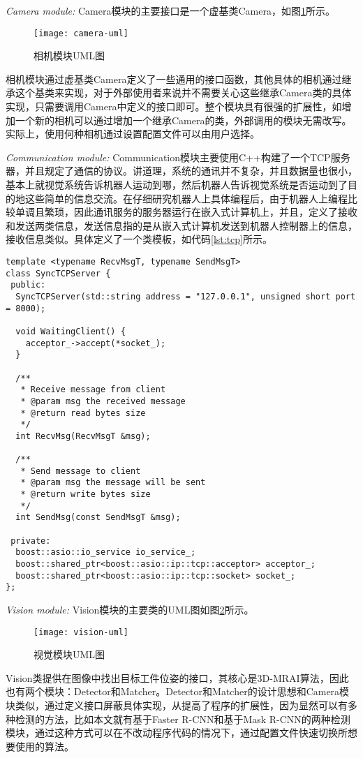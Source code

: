 \emph{Camera module:}
Camera模块的主要接口是一个虚基类Camera，如图\ref{fig:camera-uml}所示。
\begin{figure}[ht]
  \centering
  \texttt{[image: camera-uml]}
  \caption{相机模块UML图}
  \label{fig:camera-uml}
\end{figure}
相机模块通过虚基类Camera定义了一些通用的接口函数，其他具体的相机通过继承这个基类来实现，对于外部使用者来说并不需要关心这些继承Camera类的具体实现，只需要调用Camera中定义的接口即可。整个模块具有很强的扩展性，如增加一个新的相机可以通过增加一个继承Camera的类，外部调用的模块无需改写。实际上，使用何种相机通过设置配置文件可以由用户选择。

\emph{Communication module:}
Communication模块主要使用C++构建了一个TCP服务器，并且规定了通信的协议。讲道理，系统的通讯并不复杂，并且数据量也很小，基本上就视觉系统告诉机器人运动到哪，然后机器人告诉视觉系统是否运动到了目的地这些简单的信息交流。在仔细研究机器人上具体编程后，由于机器人上编程比较单调且繁琐，因此通讯服务的服务器运行在嵌入式计算机上，并且，定义了接收和发送两类信息，发送信息指的是从嵌入式计算机发送到机器人控制器上的信息，接收信息类似。具体定义了一个类模板，如代码\ref{lst:tcp}所示。
\begin{lstlisting}[caption=TCP server template, label=lst:tcp]
template <typename RecvMsgT, typename SendMsgT>
class SyncTCPServer {
 public:
  SyncTCPServer(std::string address = "127.0.0.1", unsigned short port = 8000);

  void WaitingClient() {
    acceptor_->accept(*socket_);
  }

  /**
   * Receive message from client
   * @param msg the received message
   * @return read bytes size
   */
  int RecvMsg(RecvMsgT &msg);

  /**
   * Send message to client
   * @param msg the message will be sent
   * @return write bytes size
   */
  int SendMsg(const SendMsgT &msg);

 private:
  boost::asio::io_service io_service_;
  boost::shared_ptr<boost::asio::ip::tcp::acceptor> acceptor_;
  boost::shared_ptr<boost::asio::ip::tcp::socket> socket_;
};
\end{lstlisting}

\emph{Vision module:}
Vision模块的主要类的UML图如图\ref{fig:vision-uml}所示。
\begin{figure}[ht]
  \centering
  \texttt{[image: vision-uml]}
  \caption{视觉模块UML图}
  \label{fig:vision-uml}
\end{figure}
Vision类提供在图像中找出目标工件位姿的接口，其核心是3D-MRAI算法，因此也有两个模块：Detector和Matcher。Detector和Matcher的设计思想和Camera模块类似，通过定义接口屏蔽具体实现，从提高了程序的扩展性，因为显然可以有多种检测的方法，比如本文就有基于Faster R-CNN和基于Mask R-CNN的两种检测模块，通过这种方式可以在不改动程序代码的情况下，通过配置文件快速切换所想要使用的算法。

